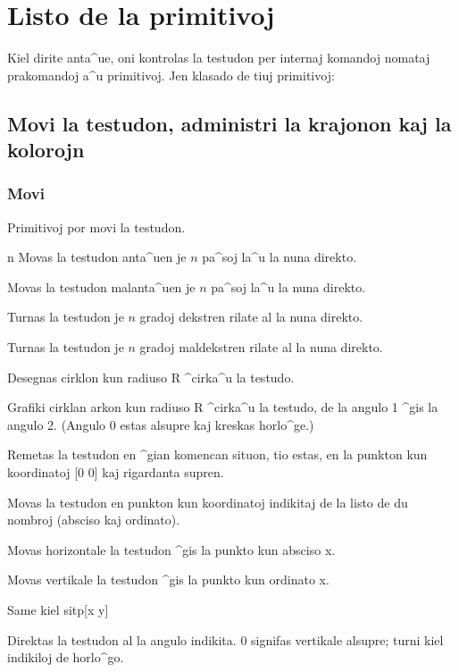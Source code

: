 \chapter {Listo de la primitivoj}
\label{liste-prim} 

Kiel dirite anta^ue, oni kontrolas la testudon per internaj komandoj
nomataj prakomandoj a^u \og primitivoj\fg.  Jen klasado de tiuj
primitivoj:

\section{Movi la testudon, administri la krajonon kaj la kolorojn}
\subsection{Movi}
Primitivoj por movi la testudon.

 {n}
Movas la testudon anta^uen je $n$ pa^soj la^u la nuna direkto.

Movas la testudon malanta^uen je $n$ pa^soj la^u la nuna direkto.

Turnas la testudon je $n$ gradoj dekstren rilate al la nuna direkto.

Turnas la testudon je $n$ gradoj maldekstren rilate al la nuna direkto.

Desegnas cirklon kun radiuso R ^cirka^u la testudo.

Grafiki cirklan arkon kun radiuso R ^cirka^u la testudo, de la angulo 
1 ^gis la angulo 2.  (Angulo 0 estas alsupre kaj 
kreskas horlo^ge.)

Remetas la testudon en ^gian komencan situon, tio estas, en la punkton
kun koordinatoj {[}0 0{]} kaj rigardanta supren.

Movas la testudon en punkton kun koordinatoj indikitaj de la listo de 
du nombroj (absciso kaj ordinato).

Movas horizontale la testudon ^gis la punkto kun absciso x.

Movas vertikale la testudon ^gis la punkto kun ordinato x.

 Same kiel sitp{[}x y{]}

Direktas la testudon al la angulo indikita.  $0$ signifas vertikale 
alsupre; turni kiel indikiloj de horlo^go.

